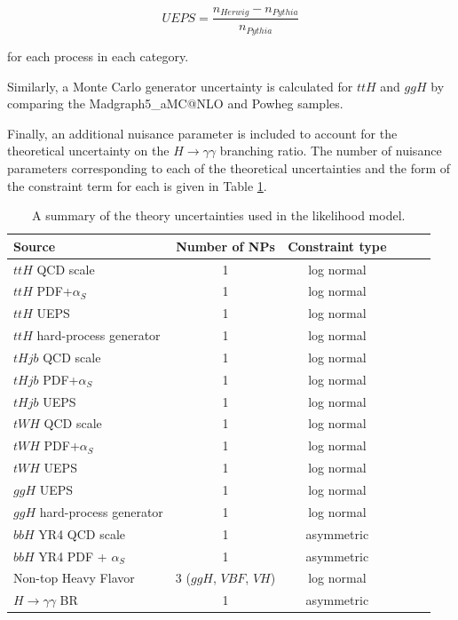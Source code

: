 \begin{equation}
UEPS= \frac{n_{Herwig}-n_{Pythia}}{n_{Pythia}}
\end{equation}

for each process in each category.

Similarly, a Monte Carlo generator uncertainty is calculated for $ttH$ and $ggH$ by comparing the Madgraph5\_aMC@NLO and Powheg samples.

Finally, an additional nuisance parameter is included to account for the theoretical uncertainty on the $H \rightarrow \gamma \gamma$ branching ratio. The number of nuisance parameters corresponding to each of the theoretical uncertainties and the form of the constraint term for each is given in Table \ref{tab:theorysyst}.

\begin{table}[ht]
\begin{center}
\begin{tabular}{lccccc}
\hline
Source & Number of NPs & Constraint type \\ \hline
$ttH$ QCD scale & 1 & log normal \\
$ttH$ PDF+$\alpha_S$ & 1 & log normal \\
$ttH$ UEPS & 1 & log normal \\
$ttH$ hard-process generator & 1 & log normal \\ \hline
$tHjb$ QCD scale& 1 & log normal \\
$tHjb$ PDF+$\alpha_S$ & 1 & log normal \\
$tHjb$ UEPS & 1 & log normal \\ \hline
$tWH$ QCD scale& 1 & log normal \\
$tWH$ PDF+$\alpha_S$ & 1 & log normal \\
$tWH$ UEPS & 1 & log normal \\ \hline
$ggH$ UEPS & 1 & log normal \\
$ggH$ hard-process generator & 1 & log normal \\
$bbH$ YR4 QCD scale & 1 & asymmetric \\
$bbH$ YR4 PDF + $\alpha_S$ & 1 & asymmetric \\
Non-top Heavy Flavor & 3 ($ggH$, $VBF$, $VH$) & log normal \\
$H\rightarrow\gamma\gamma$ BR & 1 & asymmetric \\
\hline
\end{tabular}
\end{center}
\vspace{-0.5cm}
\caption{A summary of the theory uncertainties used in the likelihood model.}
\label{tab:theorysyst}
\end{table}

